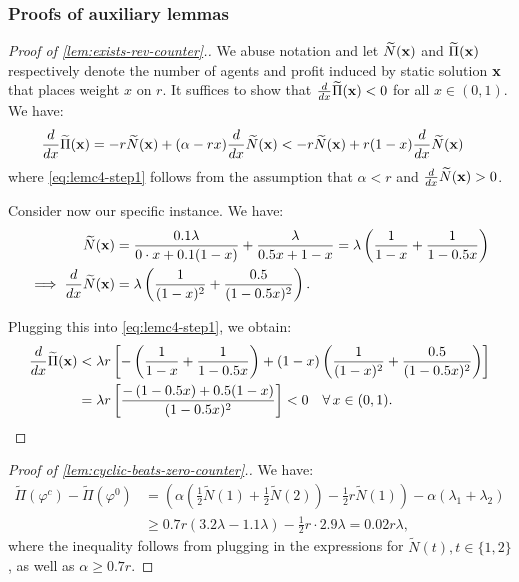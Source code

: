 \documentclass[12pt]{article}
\begin{document}
 



\subsubsection{Proofs of auxiliary lemmas}\label{apx:cyclic-aux-proofs}


\begin{proof}[Proof of \cref{lem:exists-rev-counter}.]
We abuse notation and let $\widetilde{N}(\mathbf{x})$ and $\widetilde{\Pi}(\mathbf{x})$ respectively denote the number of agents and profit induced by static solution $\mathbf{x}$ that places weight $x$ on $r$. It suffices to show that $\frac{d}{dx}\widetilde{\Pi}(\mathbf{x}) < 0$ for all $x \in (0,1)$. We have:
\begin{align}
    \frac{d}{dx}\widetilde{\Pi}(\mathbf{x}) &= -r\widetilde{N}(\mathbf{x}) + (\alpha-rx)\frac{d}{dx}\widetilde{N}(\mathbf{x})
    < -r\widetilde{N}(\mathbf{x}) + r(1-x)\frac{d}{dx}\widetilde{N}(\mathbf{x}) \label{eq:lemc4-step1}
    \end{align}
where \eqref{eq:lemc4-step1} follows from the assumption that $\alpha < r$ and $\frac{d}{dx}\widetilde{N}(\mathbf{x}) > 0$. 

Consider now our specific instance. We have:
\begin{align*}
    \widetilde{N}(\mathbf{x}) &= \frac{0.1\lambda}{0 \cdot x + 0.1 (1-x)} + \frac{\lambda}{0.5x + 1-x} = \lambda \left(\frac{1}{1-x} + \frac{1}{1-0.5x}\right) \\
    \implies \frac{d}{dx}\widetilde{N}(\mathbf{x}) &= \lambda\left(\frac{1}{(1-x)^2} + \frac{0.5}{(1-0.5x)^2}\right).
\end{align*}

Plugging this into \eqref{eq:lemc4-step1}, we obtain:
\begin{align}
    \frac{d}{dx}\widetilde{\Pi}(\mathbf{x}) &< \lambda r \left[-\left(\frac{1}{1-x} + \frac{1}{1-0.5x}\right) + (1-x)\left(\frac{1}{(1-x)^2} + \frac{0.5}{(1-0.5x)^2}\right)\right] \notag \\
    &= \lambda r\left[\frac{-\left(1-0.5x\right) + 0.5(1-x)}{(1-0.5x)^2}\right] 
    < 0 \quad \forall \, x \in (0,1). \notag
\end{align}
\end{proof}



\begin{proof}[Proof of \cref{lem:cyclic-beats-zero-counter}.]
We have:
\begin{align*}
    \widetilde{\Pi}(\varphi^c) - \widetilde{\Pi}(\varphi^0) &= \left(\alpha\left(\frac12\widetilde{N}(1) + \frac12\widetilde{N}(2)\right) - \frac12 r \widetilde{N}(1) \right) - \alpha(\lambda_1+\lambda_2) \\& \geq 0.7r\left(3.2\lambda-1.1\lambda\right) - \frac12r \cdot 2.9\lambda 
    = 0.02r\lambda,
\end{align*}
where the inequality follows from plugging in the expressions for $\widetilde{N}(t), t \in \{1,2\}$, as well as $\alpha \geq 0.7r$.
\end{proof}
\end{document}
